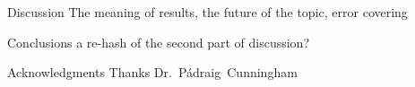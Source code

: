 \documentclass{beamer}
\begin{document}
\begin{frame}[t]{}
\begin{columns}
\begin{column}{.45\textwidth}
      \begin{block}{Discussion} 
        The meaning of results, the future of the topic, error covering
      \end{block}

      \begin{block}{Conclusions}
        a re-hash of the second part of discussion?
      \end{block}

      \begin{block}{Acknowledgments}
        Thanks Dr.~P\'adraig~Cunningham
      \end{block}
    \end{column}
  \end{columns}
\end{frame}
\end{document}
